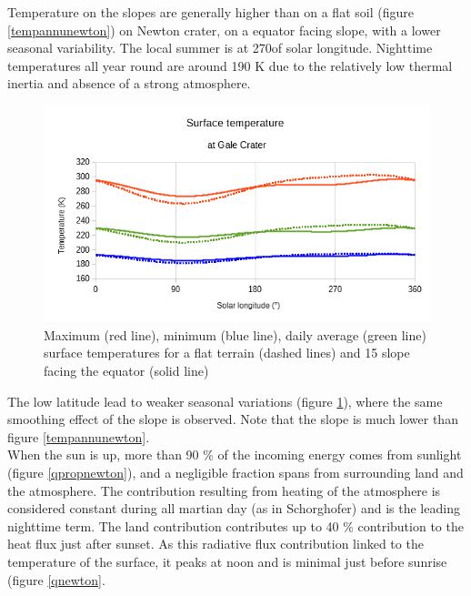 \documentclass{report}
\begin{document}
Temperature on the slopes are generally higher than on a flat soil (figure \ref{tempannunewton}) on Newton crater, on a equator facing slope, with a lower seasonal variability. The local summer is at 270\degree of solar longitude. Nighttime temperatures all year round are around 190 K due to the relatively low thermal inertia and absence of a strong atmosphere. \\

\begin{figure}
    \centering
    \includegraphics[width=.9\textwidth]{graphs/0108-gale-tempannu-flat.png}
    \caption{Maximum (red line), minimum (blue line), daily average (green line) surface temperatures for a flat terrain (dashed lines) and 15 \degree slope facing the equator (solid line)}
    \label{tempannugale}
\end{figure}{}
The low latitude lead to weaker seasonal variations (figure \ref{tempannugale}), where the same smoothing effect of the slope is observed. Note that the slope is much lower than figure \ref{tempannunewton}. \\

When the sun is up, more than 90 \% of the incoming energy comes from sunlight (figure \ref{qpropnewton}), and a negligible fraction spans from surrounding land and the atmosphere. The contribution resulting from heating of the atmosphere is considered constant during all martian day (as in Schorghofer) and is the leading nighttime term. The land contribution contributes up to 40 \% contribution to the heat flux just after sunset. As this radiative flux contribution linked to the temperature of the surface, it peaks at noon and is minimal just before sunrise (figure \ref{qnewton}. \\
\end{document}
